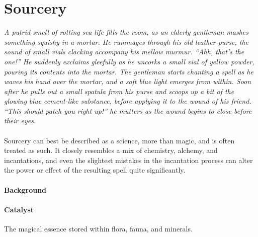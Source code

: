 \section{Sourcery}
\textit{A putrid smell of rotting sea life fills the room, as an elderly gentleman mashes something squishy in a mortar.
He rummages through his old leather purse, the sound of small vials clacking accompany his mellow murmur.
``Ahh, that's the one!'' He suddenly exclaims gleefully as he uncorks a small vial of yellow powder, pouring its contents into the mortar.
The gentleman starts chanting a spell as he waves his hand over the mortar, and a soft blue light emerges from within.
Soon after he pulls out a small spatula from his purse and scoops up a bit of the glowing blue cement-like substance, before applying it to the wound of his friend.
``This should patch you right up!'' he mutters as the wound begins to close before their eyes.}\\\\
Sourcery can best be described as a science, more than magic, and is often treated as such.
It closely resembles a mix of chemistry, alchemy, and incantations, and even the slightest mistakes in the incantation process can alter the power or effect of the resulting spell quite significantly.
\paragraph{Background}

\paragraph{Catalyst} The magical essence stored within flora, fauna, and minerals.
